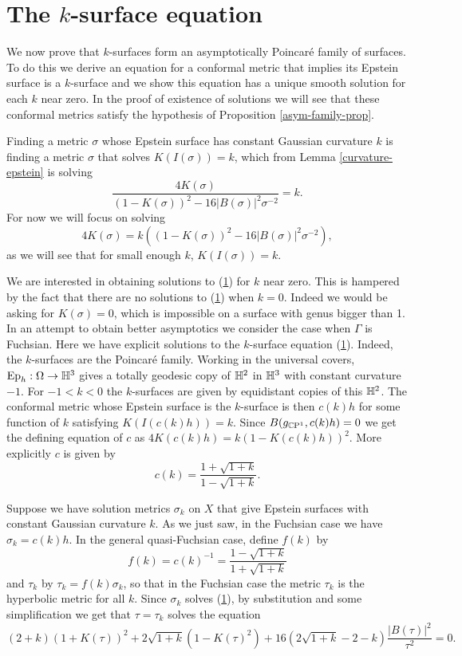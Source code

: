 \section{The $k$-surface equation}
\label{k-surface-equation}

We now prove that $k$-surfaces form an asymptotically Poincar\'e family of surfaces. 
To do this we derive an equation for a conformal metric that implies its Epstein surface is a $k$-surface and we show this equation has a unique smooth solution for each $k$ near zero. 
In the proof of existence of solutions we will see that these conformal metrics satisfy the hypothesis of Proposition \ref{asym-family-prop}. 



Finding a metric $\sigma$ whose Epstein surface has constant Gaussian curvature $k$ is finding a metric $\sigma$ that solves $K(I(\sigma)) = k$, which from Lemma \ref{curvature-epstein} is solving
\[
\frac{4K(\sigma)}{(1-K(\sigma))^2 - 16|B(\sigma)|^2\sigma^{-2}} = k.
\]
For now we will focus on solving
\begin{equation}
\label{k-surface-equation}
4K(\sigma) = k \left((1-K(\sigma))^2 - 16|B(\sigma)|^2\sigma^{-2} \right),
\end{equation}
as we will see that for small enough $k$, $K(I(\sigma)) = k$.

We are interested in obtaining solutions to (\ref{k-surface-equation}) for $k$ near zero. 
This is hampered by the fact that there are no solutions to (\ref{k-surface-equation}) when $k = 0$. 
Indeed we would be asking for $K(\sigma)=0$, which is impossible on a surface with genus bigger than 1. 
In an attempt to obtain better asymptotics we consider the case when $\Gamma$ is Fuchsian. 
Here we have explicit solutions to the $k$-surface equation (\ref{k-surface-equation}).
Indeed, the $k$-surfaces are the Poincar\'e family. 
Working in the universal covers, $\mathrm{Ep}_h : \Omega \to \mathbb{H}^3$ gives a totally geodesic copy of $\mathbb{H}^2$ in $\mathbb{H}^3$ with constant curvature $-1$. 
For $-1<k<0$  the $k$-surfaces are given by equidistant copies of this $\mathbb{H}^2$. 
The conformal metric whose Epstein surface is the $k$-surface is then $c(k)h$ for some function of $k$ satisfying $K(I(c(k)h)) = k$. 
Since $B(g_{\mathbb{C}\mathrm{P}^1},c(k)h) = 0$ we get the defining equation of $c$ as $4K(c(k)h) = k(1 - K(c(k)h))^2$.
More explicitly $c$ is given by
\[
c(k) = \frac{1+\sqrt{1+k}}{1-\sqrt{1+k}}.
\]


Suppose we have solution metrics $\sigma_k$  on $X$ that give Epstein surfaces with constant Gaussian curvature $k$. 
As we just saw, in the Fuchsian case we have $\sigma_k = c(k) h$.  
In the general quasi-Fuchsian case, define $f(k)$ by 
\[
f(k) = c(k)^{-1} = \frac{1-\sqrt{1+k}}{1+\sqrt{1+k}}
\] 
and $\tau_k$ by $\tau_k = f(k)\sigma_k$, so that in the Fuchsian case the metric $\tau_k$ is the hyperbolic metric for all $k$. 
Since $\sigma_k$ solves (\ref{k-surface-equation}), by substitution and some simplification we get that $\tau = \tau_k$ solves the equation 
\begin{equation}
\label{scaled-equation}
(2+k)(1+K(\tau))^2 + 2\sqrt{1+k}\left(1-K(\tau)^2\right) + 16\left(2\sqrt{1+k} - 2 - k  \right)\frac{|B(\tau)|^2}{\tau^2} = 0.
\end{equation}



